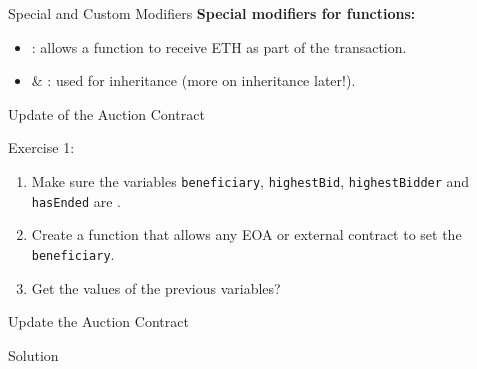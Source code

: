 \documentclass[handout]{beamer}
\begin{document}
\begin{frame}{Special and Custom Modifiers}
\textbf{Special modifiers for functions:}
	\begin{itemize}
		\item<1-> : allows a function to receive ETH as part of the transaction.
		\item<2->  \& : used for inheritance (\textcolor{focus}{more on inheritance later!}).
		\end{itemize}

\vspace{1em}
		
\vspace{1em}	
	
\end{frame}

\begin{frame}{Update of the Auction Contract}
	\begin{exercise}{Exercise 1:}
		\begin{enumerate}
			\item Make sure the variables \texttt{beneficiary}, \texttt{highestBid}, \texttt{highestBidder} and \texttt{hasEnded} are .
			\item Create a function that allows any EOA or external contract to set the \texttt{beneficiary}.
			\item Get the values of the previous variables?
		\end{enumerate}
	\end{exercise}
\end{frame}

\begin{frame}{Update the Auction Contract}
	\begin{samplecode}{Solution}
		
	\end{samplecode}
\end{frame}
\end{document}
